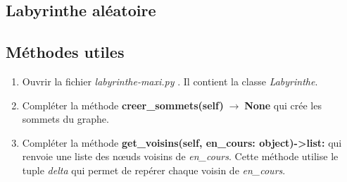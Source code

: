 \documentclass[a4paper,11pt]{article}
\begin{document}
\begin{Form}
\section{Labyrinthe aléatoire}
\subsection{Méthodes utiles}
\begin{activite}
\begin{enumerate}
\item Ouvrir la fichier \emph{labyrinthe-maxi.py} . Il contient la classe \emph{Labyrinthe}.
\item Compléter la méthode \textbf{creer\_sommets(self)$\;\rightarrow\;$None} qui crée les sommets du graphe.
\item Compléter la méthode \textbf{get\_voisins(self, en\_cours: object)->list:} qui renvoie une liste des nœuds voisins de \emph{en\_cours}. Cette méthode utilise le tuple \emph{delta} qui permet de repérer chaque voisin de \emph{en\_cours}.
\end{enumerate}
\end{activite}

\end{Form}
\end{document}
